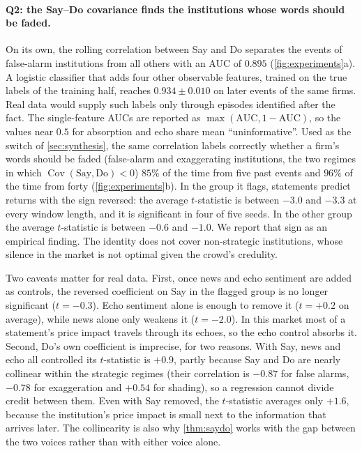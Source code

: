 \documentclass{article}
\theoremstyle{plain}
\theoremstyle{definition}
\theoremstyle{remark}
\DeclareMathOperator{\Cov}{Cov}
\begin{document}
\paragraph{Q2: the Say--Do covariance finds the institutions whose words should be faded.} On its own, the rolling correlation between Say and Do separates the events of false-alarm institutions from all others with an AUC of $0.895$ (\cref{fig:experiments}a). A logistic classifier that adds four other observable features, trained on the true labels of the training half, reaches $0.934\pm0.010$ on later events of the same firms. Real data would supply such labels only through episodes identified after the fact. The single-feature AUCs are reported as $\max(\text{AUC},1-\text{AUC})$, so the values near $0.5$ for absorption and echo share mean ``uninformative''. Used as the switch of \cref{sec:synthesis}, the same correlation labels correctly whether a firm's words should be faded (false-alarm and exaggerating institutions, the two regimes in which $\Cov(\text{Say},\text{Do})<0$) $85\%$ of the time from five past events and $96\%$ of the time from forty (\cref{fig:experiments}b). In the group it flags, statements predict returns with the sign reversed: the average $t$-statistic is between $-3.0$ and $-3.3$ at every window length, and it is significant in four of five seeds. In the other group the average $t$-statistic is between $-0.6$ and $-1.0$. We report that sign as an empirical finding. The identity does not cover non-strategic institutions, whose silence in the market is not optimal given the crowd's credulity.

Two caveats matter for real data. First, once news and echo sentiment are added as controls, the reversed coefficient on Say in the flagged group is no longer significant ($t=-0.3$). Echo sentiment alone is enough to remove it ($t=+0.2$ on average), while news alone only weakens it ($t=-2.0$). In this market most of a statement's price impact travels through its echoes, so the echo control absorbs it. Second, Do's own coefficient is imprecise, for two reasons. With Say, news and echo all controlled its $t$-statistic is $+0.9$, partly because Say and Do are nearly collinear within the strategic regimes (their correlation is $-0.87$ for false alarms, $-0.78$ for exaggeration and $+0.54$ for shading), so a regression cannot divide credit between them. Even with Say removed, the $t$-statistic averages only $+1.6$, because the institution's price impact is small next to the information that arrives later. The collinearity is also why \cref{thm:saydo} works with the gap between the two voices rather than with either voice alone.
\end{document}
